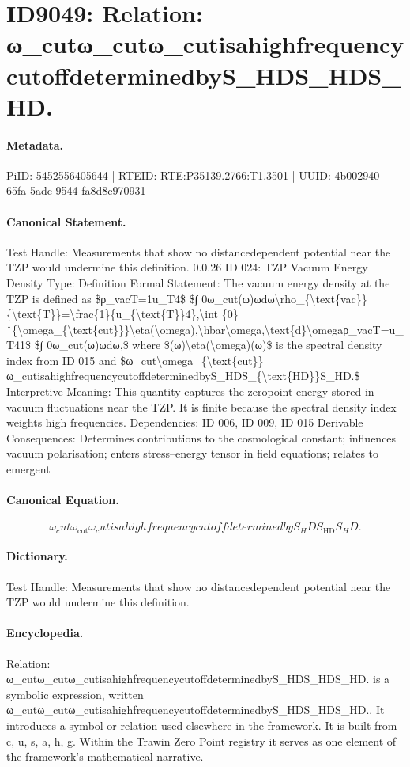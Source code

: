 \section*{ID9049: Relation: ω\_cutω\_cutω\_cutisahighfrequencycutoffdeterminedbyS\_HDS\_HDS\_HD.}
\paragraph{Metadata.}
PiID: 5452556405644 | RTEID: RTE:P35139.2766:T1.3501 | UUID: 4b002940-65fa-5adc-9544-fa8d8c970931

\paragraph{Canonical Statement.}
Test Handle: Measurements that show no distancedependent potential near the TZP would undermine this definition. 0.0.26 ID 024: TZP Vacuum Energy Density Type: Definition Formal Statement: The vacuum energy density at the TZP is defined as \$ρ\_vacT=1u\_T4\$ \$∫ 0ω\_cut(ω)ωdω\textbackslash{}rho\_\{\textbackslash{}text\{vac\}\}\{\textbackslash{}text\{T\}\}=\textbackslash{}frac\{1\}\{u\_\{\textbackslash{}text\{T\}\}4\},\textbackslash{}int \{0\}ˆ\{\textbackslash{}omega\_\{\textbackslash{}text\{cut\}\}\}\textbackslash{}eta(\textbackslash{}omega),\textbackslash{}hbar\textbackslash{}omega,\textbackslash{}text\{d\}\textbackslash{}omegaρ\_vacT=u\_T41\$ \$∫ 0ω\_cut(ω)ωdω,\$ where \$(ω)\textbackslash{}eta(\textbackslash{}omega)(ω)\$ is the spectral density index from ID 015 and \$ω\_cut\textbackslash{}omega\_\{\textbackslash{}text\{cut\}\}ω\_cutisahighfrequencycutoffdeterminedbyS\_HDS\_\{\textbackslash{}text\{HD\}\}S\_HD.\$ Interpretive Meaning: This quantity captures the zeropoint energy stored in vacuum fluctuations near the TZP. It is finite because the spectral density index weights high frequencies. Dependencies: ID 006, ID 009, ID 015 Derivable Consequences: Determines contributions to the cosmological constant; influences vacuum polarisation; enters stress–energy tensor in field equations; relates to emergent

\paragraph{Canonical Equation.}
\[
ω_cut\omega_{\text{cut}}ω_cutisahighfrequencycutoffdeterminedbyS_HDS_{\text{HD}}S_HD.
\]

\paragraph{Dictionary.}
Test Handle: Measurements that show no distancedependent potential near the TZP would undermine this definition.

\paragraph{Encyclopedia.}
Relation: ω\_cutω\_cutω\_cutisahighfrequencycutoffdeterminedbyS\_HDS\_HDS\_HD. is a symbolic expression, written ω\_cutω\_cutω\_cutisahighfrequencycutoffdeterminedbyS\_HDS\_HDS\_HD.. It introduces a symbol or relation used elsewhere in the framework. It is built from c, u, s, a, h, g. Within the Trawin Zero Point registry it serves as one element of the framework's mathematical narrative.
